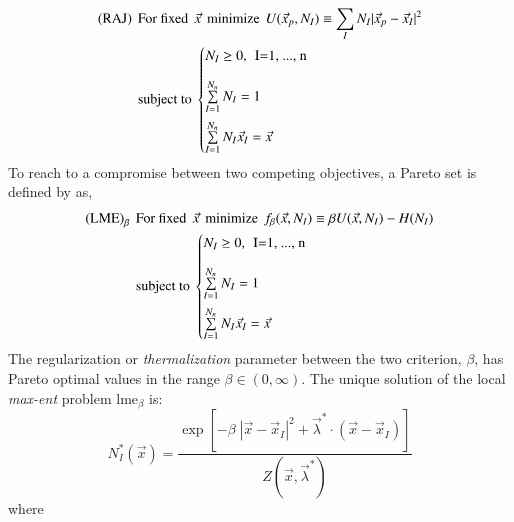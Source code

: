 \documentclass[preprint,12pt,a4paper]{elsarticle}
\begin{document}
\begin{align*}
  \label{eq:RAJAN}
  \text{(RAJ)} \hspace{0.15cm} &\text{For fixed} \hspace{0.15cm}
  \vec{x} \hspace{0.15cm} \text{minimize} \hspace{0.15cm} U(\vec{x}_p,N_I) \equiv
\sum_I N_I |\vec{x}_p - \vec{x}_I |^2\\
  &\text{subject to}\
  \begin{cases}
    N_I \ge 0, \hspace{0.15cm} \text{I=1, ..., n} \\[1em]   
    \sum\limits_{I=1}^{N_n}{N_I} = 1 \\[1em]   
    \sum\limits_{I=1}^{N_n}{N_I \vec{x}_I} = \vec{x} \\
  \end{cases}
\end{align*}
To reach to a compromise between two competing objectives, a Pareto set is defined by \cite{Arroyo2006} as,
\begin{align*}
  \label{eq:LME-scheme-pareto-set}
  \text{(LME)}_{\beta} \hspace{0.15cm} &\text{For fixed} \hspace{0.15cm}
  \vec{x} \hspace{0.15cm} \text{minimize} \hspace{0.15cm} f_{\beta}(\vec{x}, N_I) \equiv \beta U(\vec{x},N_I) - H(N_I) \\
  &\text{subject to}\
  \begin{cases}
    N_I \ge 0, \hspace{0.15cm} \text{I=1, ..., n} \\[1em]   
    \sum\limits_{I=1}^{N_n}{N_I} = 1 \\[1em]   
    \sum\limits_{I=1}^{N_n}{N_I \vec{x}_I} = \vec{x} \\
  \end{cases}
\end{align*}
The regularization or \textit{thermalization} parameter
between the two criterion, $\beta$, has Pareto optimal values in the range
$\beta \in (0,\infty)$. The unique solution of
the local \textit{max-ent} problem \acrshort{lme}$_\beta$ is:
\begin{equation}
  \label{eq:LME-p}
N_I^*(\vec{x})=\frac{\exp\left[ -\beta \; |\vec{x}-\vec{x}_I|^2 +
    \vec{\lambda}^* \cdot (\vec{x}-\vec{x}_I) \right] } {Z(\vec{x},\vec{\lambda}^*)}
\end{equation}
where
\end{document}
